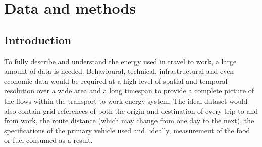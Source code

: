 
\chapter{Data and methods} %
\label{Chapter4}
\fancyhead[RE,LO]{\thepage}
\section{Introduction} 
To fully describe and understand the energy used in travel to work, a large
amount of data is needed. Behavioural, technical, infrastructural and even
economic data would be required at a high level of spatial and temporal
resolution over a wide area and a long timespan to provide a complete
picture of the flows within the transport-to-work energy system. %
The ideal dataset would also contain grid references of both the origin and
destination of every trip to and from work, the
route distance (which may change from one day to the next), the specifications
of the primary vehicle used and, ideally, measurement of the food or fuel
consumed as a result.

